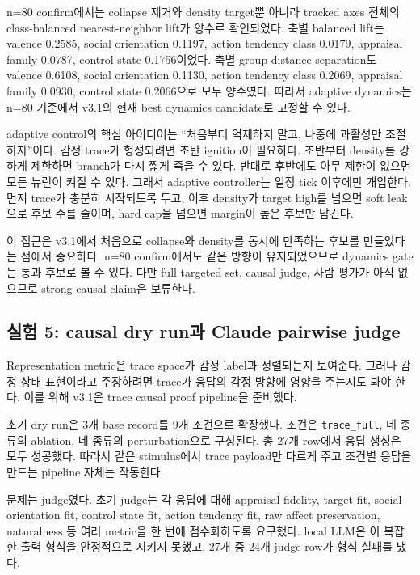 \documentclass[11pt,a4paper]{article}
\begin{document}
n=80 confirm에서는 collapse 제거와 density target뿐 아니라 tracked axes 전체의 class-balanced nearest-neighbor lift가 양수로 확인되었다. 축별 balanced lift는 valence 0.2585, social orientation 0.1197, action tendency class 0.0179, appraisal family 0.0787, control state 0.1756이었다. 축별 group-distance separation도 valence 0.6108, social orientation 0.1130, action tendency class 0.2069, appraisal family 0.0930, control state 0.2066으로 모두 양수였다. 따라서 adaptive dynamics는 n=80 기준에서 v3.1의 현재 best dynamics candidate로 고정할 수 있다.

adaptive control의 핵심 아이디어는 ``처음부터 억제하지 말고, 나중에 과활성만 조절하자''이다. 감정 trace가 형성되려면 초반 ignition이 필요하다. 초반부터 density를 강하게 제한하면 branch가 다시 짧게 죽을 수 있다. 반대로 후반에도 아무 제한이 없으면 모든 뉴런이 켜질 수 있다. 그래서 adaptive controller는 일정 tick 이후에만 개입한다. 먼저 trace가 충분히 시작되도록 두고, 이후 density가 target high를 넘으면 soft leak으로 후보 수를 줄이며, hard cap을 넘으면 margin이 높은 후보만 남긴다.

이 접근은 v3.1에서 처음으로 collapse와 density를 동시에 만족하는 후보를 만들었다는 점에서 중요하다. n=80 confirm에서도 같은 방향이 유지되었으므로 dynamics gate는 통과 후보로 볼 수 있다. 다만 full targeted set, causal judge, 사람 평가가 아직 없으므로 strong causal claim은 보류한다.

\subsection{실험 5: causal dry run과 Claude pairwise judge}

Representation metric은 trace space가 감정 label과 정렬되는지 보여준다. 그러나 감정 상태 표현이라고 주장하려면 trace가 응답의 감정 방향에 영향을 주는지도 봐야 한다. 이를 위해 v3.1은 trace causal proof pipeline을 준비했다.

초기 dry run은 3개 base record를 9개 조건으로 확장했다. 조건은 \texttt{trace\_full}, 네 종류의 ablation, 네 종류의 perturbation으로 구성된다. 총 27개 row에서 응답 생성은 모두 성공했다. 따라서 같은 stimulus에서 trace payload만 다르게 주고 조건별 응답을 만드는 pipeline 자체는 작동한다.

문제는 judge였다. 초기 judge는 각 응답에 대해 appraisal fidelity, target fit, social orientation fit, control state fit, action tendency fit, raw affect preservation, naturalness 등 여러 metric을 한 번에 점수화하도록 요구했다. local LLM은 이 복잡한 출력 형식을 안정적으로 지키지 못했고, 27개 중 24개 judge row가 형식 실패를 냈다.
\end{document}
